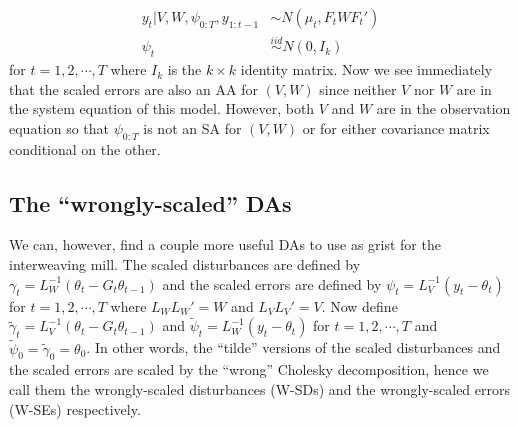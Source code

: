 \documentclass{article}
\begin{document}
\begin{align*}
  y_t|V,W,\psi_{0:T},y_{1:t-1} &\sim N(\mu_t, F_tWF_t')\\
  \psi_t & \stackrel{iid}{\sim} N(0,I_k)
\end{align*}
for $t=1,2,\cdots,T$ where $I_k$ is the $k\times k$ identity matrix. Now we see immediately that the scaled errors are also an AA for $(V,W)$ since neither $V$ nor $W$ are in the system equation of this model. However, both $V$ and $W$ are in the observation equation so that $\psi_{0:T}$ is not an SA for $(V,W)$ or for either covariance matrix conditional on the other.

\subsection{The ``wrongly-scaled'' DAs}
We can, however, find a couple more useful DAs to use as grist for the interweaving mill. The scaled disturbances are defined by $\gamma_t = L_W^{-1}(\theta_t - G_t\theta_{t-1})$  and the scaled errors are defined by $\psi_t = L_V^{-1}(y_t - \theta_t)$ for $t=1,2,\cdots,T$ where $L_WL_W' = W$ and $L_VL_V' = V$. Now define $\tilde{\gamma}_t=L_V^{-1}(\theta_t - G_t\theta_{t-1})$ and $\tilde{\psi}_t=L_W^{-1}(y_t - \theta_t)$ for $t=1,2,\cdots,T$ and $\tilde{\psi}_0=\tilde{\gamma}_0=\theta_0$. In other words, the ``tilde'' versions of the scaled disturbances and the scaled errors are scaled by the ``wrong'' Cholesky decomposition, hence we call them the wrongly-scaled disturbances (W-SDs) and the wrongly-scaled errors (W-SEs) respectively. 
\end{document}
